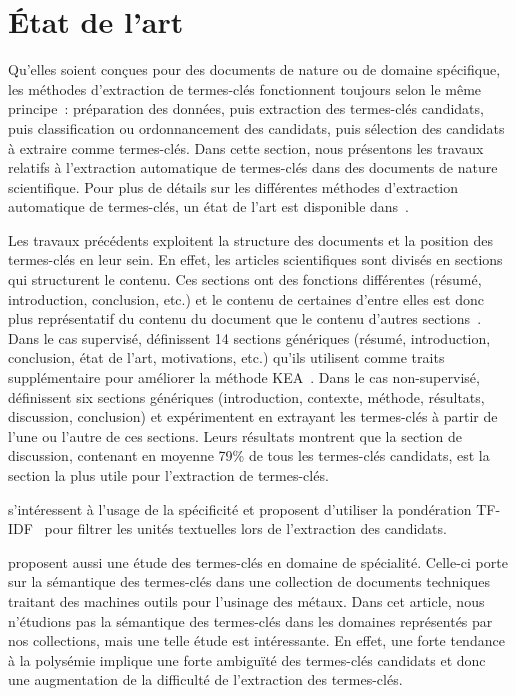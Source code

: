\section{État de l'art}
\label{sec:etat_de_l_art}
  Qu'elles soient conçues pour des documents de nature ou de domaine spécifique,
  les méthodes d'extraction de termes-clés fonctionnent toujours selon le même
  principe~: préparation des données, puis extraction des termes-clés candidats,
  puis classification ou ordonnancement des candidats, puis sélection des
  candidats à extraire comme termes-clés. Dans cette section, nous présentons
  les travaux relatifs à l'extraction automatique de termes-clés dans des
  documents de nature scientifique. Pour plus de détails sur les différentes
  méthodes d'extraction automatique de termes-clés, un état de l'art est
  disponible dans~\cite{bougouin2013stateoftheart}.

  Les travaux précédents exploitent la structure des documents et la position
  des termes-clés en leur sein. En effet, les articles scientifiques sont
  divisés en sections qui structurent le contenu. Ces sections ont des fonctions
  différentes (résumé, introduction, conclusion, etc.) et le contenu de
  certaines d'entre elles est donc plus représentatif du contenu du document que
  le contenu d'autres sections~\cite{shah2003wherearethekeywords}. Dans le cas
  supervisé,  définissent 14 sections
  génériques (résumé, introduction, conclusion, état de l'art, motivations,
  etc.) qu'ils utilisent comme traits supplémentaire pour améliorer la méthode
  KEA~\cite{witten1999kea}. Dans le cas non-supervisé,
   définissent six sections
  génériques (introduction, contexte, méthode, résultats, discussion,
  conclusion) et expérimentent en extrayant les termes-clés à partir de l'une ou
  l'autre de ces sections. Leurs résultats montrent que la section de
  discussion, contenant en moyenne 79\% de tous les termes-clés candidats, est
  la section la plus utile pour l'extraction de termes-clés.

   s'intéressent à l'usage de la spécificité et
  proposent d'utiliser la pondération TF-IDF~\cite{jones1972tfidf} pour filtrer
  les unités textuelles lors de l'extraction des candidats.

   proposent aussi une étude des
  termes-clés en domaine de spécialité. Celle-ci porte sur la sémantique des
  termes-clés dans une collection de documents techniques traitant des machines
  outils pour l'usinage des métaux. Dans cet article, nous n'étudions pas la
  sémantique des termes-clés dans les domaines représentés par nos collections,
  mais une telle étude est intéressante. En effet, une forte tendance à la
  polysémie implique une forte ambiguïté des termes-clés candidats et donc une
  augmentation de la difficulté de l'extraction des termes-clés.

